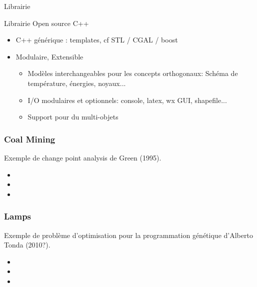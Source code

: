\documentclass{beamer}
\begin{document}
\begin{frame}{Librairie}
\begin{block}{Librairie Open source C++}
\begin{itemize}
\item C++ générique : templates, cf  STL / CGAL / boost\\
\item Modulaire, Extensible
\begin{itemize}
 \item Modèles interchangeables pour les concepts orthogonaux: Schéma de température, énergies, noyaux...
 \item I/O modulaires et optionnels: console, latex, wx GUI, shapefile...
 \item Support pour du multi-objets
\end{itemize}
\end{itemize}
\end{block}

\end{frame}


\begin{frame}
\frametitle{Coal Mining}
Exemple de change point analysis de Green (1995).
\begin{itemize}
\item 
\item 
\item 
\end{itemize}
\end{frame}

\begin{frame}
\frametitle{Lamps}
Exemple de problème d'optimisation pour la programmation génétique d'Alberto Tonda (2010?).
\begin{itemize}
\item 
\item 
\item 
\end{itemize}
\end{frame}
\end{document}
